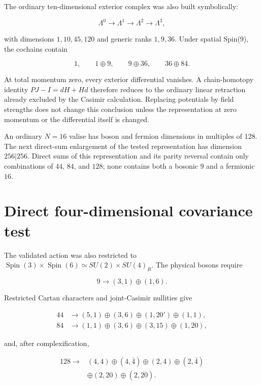 \documentclass[11pt]{article}
\begin{document}
The ordinary ten-dimensional exterior complex was also built symbolically:

\begin{equation}
\Lambda^0\longrightarrow\Lambda^1\longrightarrow\Lambda^2
\longrightarrow\Lambda^3,
\end{equation}

with dimensions $1,10,45,120$ and generic ranks $1,9,36$.  Under spatial
Spin(9), the cochains contain

\begin{equation}
1,\qquad 1\oplus9,\qquad9\oplus36,\qquad36\oplus84.
\end{equation}

At total momentum zero, every exterior differential vanishes.  A chain-homotopy
identity $PJ-I=dH+Hd$ therefore reduces to the ordinary linear retraction already
excluded by the Casimir calculation.  Replacing potentials by field strengths
does not change this conclusion unless the representation at zero momentum or
the differential itself is changed.

An ordinary $N=16$ valise has boson and fermion dimensions in multiples of 128.
The next direct-sum enlargement of the tested representation has dimension
$256\vert256$.  Direct sums of this representation and its parity reversal
contain only combinations of $44$, $84$, and $128$; none contains both a
bosonic $9$ and a fermionic $16$.

\section{Direct four-dimensional covariance test}

The validated action was also restricted to
$\operatorname{Spin}(3)\times\operatorname{Spin}(6)\simeq
SU(2)\times SU(4)_R$.  The physical bosons require

\begin{equation}
9\longrightarrow(3,1)\oplus(1,6).
\end{equation}

Restricted Cartan characters and joint-Casimir nullities give

\begin{align}
44 &\longrightarrow (5,1)\oplus(3,6)\oplus(1,20')\oplus(1,1),\\
84 &\longrightarrow (1,1)\oplus(3,6)\oplus(3,15)\oplus(1,20),
\end{align}

and, after complexification,

\begin{align}
128\longrightarrow{}&(4,4)\oplus(4,\bar4)\oplus(2,4)\oplus(2,\bar4)\\
&\oplus(2,20)\oplus(2,\overline{20}).
\end{align}
\end{document}
